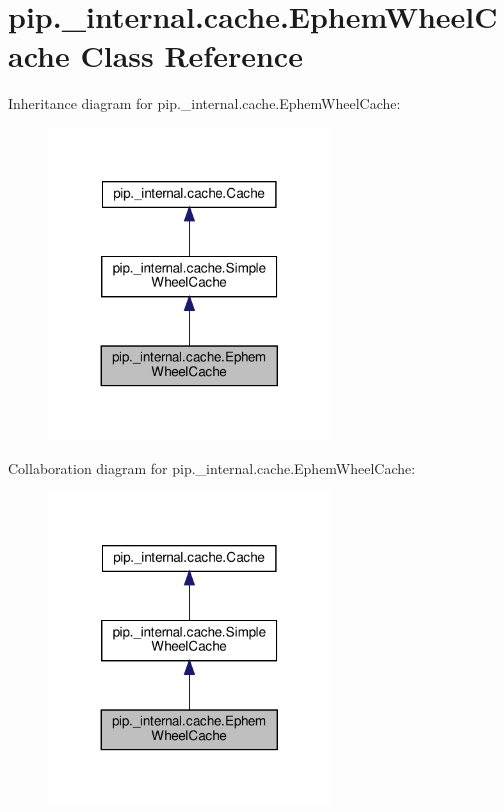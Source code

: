 \hypertarget{classpip_1_1__internal_1_1cache_1_1EphemWheelCache}{}\section{pip.\+\_\+internal.\+cache.\+Ephem\+Wheel\+Cache Class Reference}
\label{classpip_1_1__internal_1_1cache_1_1EphemWheelCache}


Inheritance diagram for pip.\+\_\+internal.\+cache.\+Ephem\+Wheel\+Cache\+:
\nopagebreak
\begin{figure}[H]
\begin{center}
\leavevmode
\includegraphics[width=212pt]{classpip_1_1__internal_1_1cache_1_1EphemWheelCache__inherit__graph}
\end{center}
\end{figure}


Collaboration diagram for pip.\+\_\+internal.\+cache.\+Ephem\+Wheel\+Cache\+:
\nopagebreak
\begin{figure}[H]
\begin{center}
\leavevmode
\includegraphics[width=212pt]{classpip_1_1__internal_1_1cache_1_1EphemWheelCache__coll__graph}
\end{center}
\end{figure}

